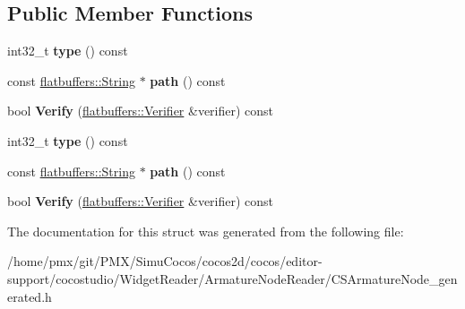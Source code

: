 \subsection*{Public Member Functions}
\begin{DoxyCompactItemize}
\item 
\mbox{\label{structflatbuffers_1_1ResourceItemData_a7890600189591871e1b674504f0a0a22}} 
int32\+\_\+t {\bfseries type} () const
\item 
\mbox{\label{structflatbuffers_1_1ResourceItemData_a3bdc3be1b11143884998e66cddc0efaa}} 
const \hyperlink{structflatbuffers_1_1String}{flatbuffers\+::\+String} $\ast$ {\bfseries path} () const
\item 
\mbox{\label{structflatbuffers_1_1ResourceItemData_a84ccf94183146fd63123d00d4591c161}} 
bool {\bfseries Verify} (\hyperlink{classflatbuffers_1_1Verifier}{flatbuffers\+::\+Verifier} \&verifier) const
\item 
\mbox{\label{structflatbuffers_1_1ResourceItemData_a7890600189591871e1b674504f0a0a22}} 
int32\+\_\+t {\bfseries type} () const
\item 
\mbox{\label{structflatbuffers_1_1ResourceItemData_a3bdc3be1b11143884998e66cddc0efaa}} 
const \hyperlink{structflatbuffers_1_1String}{flatbuffers\+::\+String} $\ast$ {\bfseries path} () const
\item 
\mbox{\label{structflatbuffers_1_1ResourceItemData_a84ccf94183146fd63123d00d4591c161}} 
bool {\bfseries Verify} (\hyperlink{classflatbuffers_1_1Verifier}{flatbuffers\+::\+Verifier} \&verifier) const
\end{DoxyCompactItemize}


The documentation for this struct was generated from the following file\+:\begin{DoxyCompactItemize}
\item 
/home/pmx/git/\+P\+M\+X/\+Simu\+Cocos/cocos2d/cocos/editor-\/support/cocostudio/\+Widget\+Reader/\+Armature\+Node\+Reader/C\+S\+Armature\+Node\+\_\+generated.\+h\end{DoxyCompactItemize}
